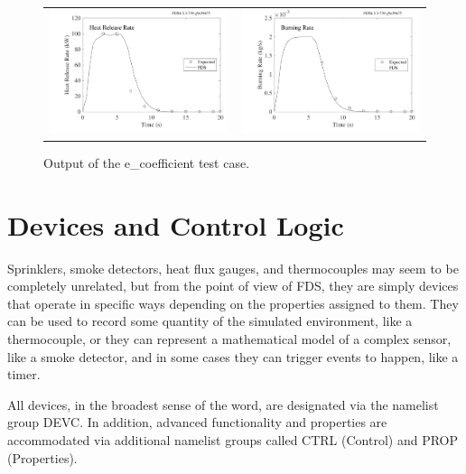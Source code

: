 \documentclass[11pt]{book}
\begin{document}
\begin{figure}[ht]
\begin{tabular*}{\textwidth}{lr}
\includegraphics[width=3.2in]{SCRIPT_FIGURES/e_coefficient_q} &
\includegraphics[width=3.2in]{SCRIPT_FIGURES/e_coefficient_br}
\end{tabular*}
\caption[Results of the {\ct e\_coefficient} test case]{Output of the  {\ct e\_coefficient} test case.}
\label{e_coef_fig}
\end{figure}







\chapter{Devices and Control Logic}

Sprinklers, smoke detectors, heat flux gauges, and thermocouples
may seem to be completely unrelated, but from the point of view
of FDS, they are simply devices that operate in specific ways depending
on the properties assigned to them. They can be used to record some
quantity of the simulated environment, like a thermocouple, or they can represent a mathematical model
of a complex sensor, like a smoke detector,
and in some cases they can trigger events to happen, like a timer.

All devices, in the broadest sense of the word,
are designated via the namelist group {\ct DEVC}.
In addition, advanced functionality and properties are accommodated
via additional namelist groups called {\ct CTRL} (Control) and
{\ct PROP} (Properties).
\end{document}
